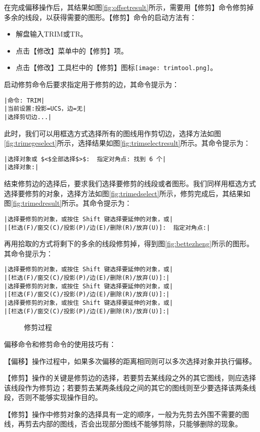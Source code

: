 \begin{procedure}
在完成偏移操作后，其结果如图\ref{fig:offsetresult}所示，需要用【修剪】命令修剪掉多余的线段，以获得需要的图形。【修剪】命令的启动方法有：
\begin{itemize}
\item 解盘输入TRIM或TR。
\item 点击【修改】菜单中的【修剪】项。
\item 点击【修改】工具栏中的【修剪】图标\texttt{[image: trimtool.png]}。
\end{itemize}
启动修剪命令后要求指定用于修剪的边，其命令提示为：
\begin{lstlisting}
|命令: TRIM|
|当前设置:投影=UCS，边=无|
|选择剪切边...|
\end{lstlisting}
此时，我们可以用框选方式选择所有的图线用作剪切边，选择方法如图\ref{fig:trimegeselect}所示，选择结果如图\ref{fig:trimselectresult}所示。其命令提示为：
\begin{lstlisting}
|选择对象或 $<$全部选择$>$:  指定对角点: 找到 6 个|
|选择对象:|
\end{lstlisting}
结束修剪边的选择后，要求我们选择要修剪的线段或者图形。我们同样用框选方式选择要修剪的对象，选择方法如图\ref{fig:trimedselect}所示，修剪完成后，其结果如图\ref{fig:trimedresult}所示。其命令提示为：
\begin{lstlisting}
|选择要修剪的对象，或按住 Shift 键选择要延伸的对象，或|
|[栏选(F)/窗交(C)/投影(P)/边(E)/删除(R)/放弃(U)]:  指定对角点:|
\end{lstlisting}
再用拾取的方式将剩下的多余的线段修剪掉，得到图\ref{fig:bettezheng}所示的图形。其命令提示为：
\begin{lstlisting}
|选择要修剪的对象，或按住 Shift 键选择要延伸的对象，或|
|[栏选(F)/窗交(C)/投影(P)/边(E)/删除(R)/放弃(U)]:|
|选择要修剪的对象，或按住 Shift 键选择要延伸的对象，或|
|[栏选(F)/窗交(C)/投影(P)/边(E)/删除(R)/放弃(U)]:|
|选择要修剪的对象，或按住 Shift 键选择要延伸的对象，或|
|[栏选(F)/窗交(C)/投影(P)/边(E)/删除(R)/放弃(U)]:|
\end{lstlisting}
\begin{figure}[htbp]
\hspace{20pt}
\hspace{20pt}
\hspace{20pt}
\caption{修剪过程}
\end{figure}
\end{procedure}

偏移命令和修剪命令的使用技巧有：
\begin{tips}
\item 【偏移】操作过程中，如果多次偏移的距离相同则可以多次选择对象并执行偏移。
\item 【修剪】操作的关键是修剪边的选择，若要剪去某线段之外的其它图线，则应选择该线段作为修剪边；若要剪去某两条线段之间的其它的图线则至少要选择该两条线段，否则不能够实现操作目的。
\item 【修剪】操作中修剪对象的选择具有一定的顺序，一般为先剪去外围不需要的图线，再剪去内部的图线，否会出现部分图线不能够剪除，只能够删除的现象。
\end{tips}

\endinput